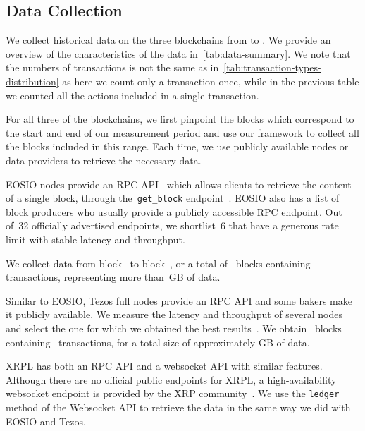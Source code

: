 \subsection{Data Collection}
We collect historical data on the three blockchains from \startdate to \finishdate.
We provide an overview of the characteristics of the data in~\autoref{tab:data-summary}.
We note that the numbers of transactions is not the same as in~\autoref{tab:transaction-types-distribution} as here we count only a transaction once, while in the previous table we counted all the actions included in a single transaction.

For all three of the blockchains, we first pinpoint the blocks which correspond to the start and end of our measurement period and use our framework to collect all the blocks included in this range.
Each time, we use publicly available nodes or data providers to retrieve the necessary data.

EOSIO nodes provide an RPC API~\cite{EOS.IO2020} which allows clients to retrieve the content of a single block, through the~\texttt{get\_block} endpoint~\cite{EOSDocs2020}.
EOSIO also has a list of block producers who usually provide a publicly accessible RPC endpoint. Out of~32 officially advertised endpoints, we shortlist~6 that have a generous rate limit with stable latency and throughput.

We collect data from block~\empirical{\numprint{\EOSStartBlock}} to block~\empirical{\numprint{\EOSEndBlock}}, or a total of~\empirical{\blockscount{\EOSStartBlock}{\EOSEndBlock}} blocks containing~ transactions, representing more than~GB of data.

Similar to EOSIO, Tezos full nodes provide an RPC API and some bakers make it publicly available. We measure the latency and throughput of several nodes and select the one for which we obtained the best results~\cite{tezos-ukraine}.
We obtain~\empirical{\blockscount{\TezosStartBlock}{\TezosEndBlock}} blocks containing~ transactions, for a total size of approximately  GB of data.

XRPL has both an RPC API and a websocket API with similar features. Although there are no official public endpoints for XRPL, a high-availability websocket endpoint is provided by the XRP community~\cite{Wind2020}. We use the \texttt{ledger} method of the Websocket API to retrieve the data in the same way we did with EOSIO and Tezos.

